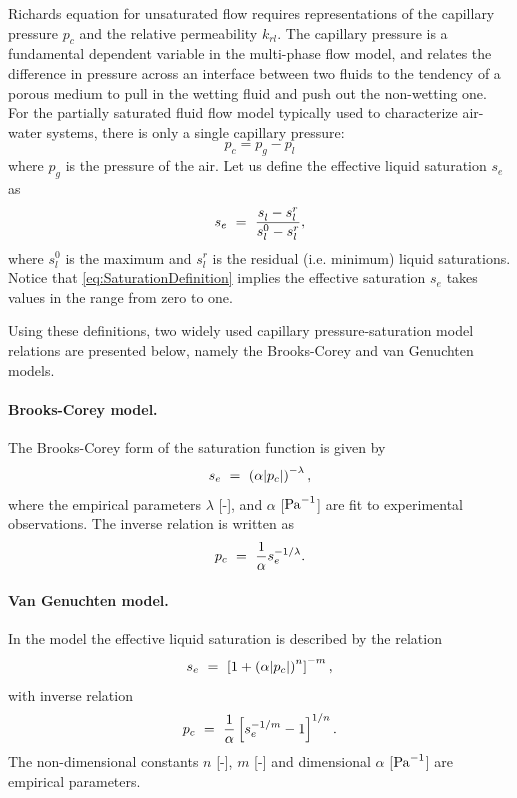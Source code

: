 Richards equation for unsaturated flow
requires representations of the capillary pressure $p_c$ and the relative permeability $k_{rl}$.  
The capillary pressure is a fundamental dependent variable in the multi-phase flow model, and
relates the difference in pressure across an interface between two
fluids to the tendency of a porous medium to pull in the wetting fluid
and push out the non-wetting one.
For the partially saturated fluid flow model typically used to
characterize air-water systems, 
there is only a single capillary pressure:
\begin{equation} \label{eq:GasLiquidCapillaryPressure}
  p_c = p_g - p_l
\end{equation}
where $p_g$ is the pressure of the air. 
Let us define the effective liquid saturation $s_e$ as
\begin{equation}
\label{eq:SaturationDefinition}
s_e \ =\  \frac{s_l^{} - s_l^r}{s_l^0 - s_l^r}, 
\end{equation}
where $s_l^0$ is the maximum and
$s_l^r$ is the residual (i.e. minimum) liquid saturations. 
Notice that \eqref{eq:SaturationDefinition} implies the effective saturation $s_e$
takes values in the range from zero to one.

Using these definitions, 
two widely used capillary pressure-saturation model relations are presented below, 
namely the Brooks-Corey \citep{brooks1964hydraulic} and van Genuchten \citep{van1980closed} 
models.


\paragraph{Brooks-Corey model.}
The Brooks-Corey form of the saturation function \citep{brooks1964hydraulic} is given by
\begin{equation}
  \label{eq:BC_s_pc_relation}
  s_e \ =\  \left( \alpha |p_c| \right)^{-\lambda}, 
\end{equation}
where the empirical parameters $\lambda$ [-], and $\alpha$ [${\rm Pa}^{-1}$] 
are fit to experimental observations.
The inverse relation is written as
\begin{equation}
  \label{eq:BC_pc_s_relation}
  p_c \ =\  \frac{1}{\alpha} s_e^{-1/\lambda}.
\end{equation}

\paragraph{Van Genuchten model.}
In the \citet{van1980closed} model the effective liquid saturation is
described by the relation
%
\begin{equation}  
  \label{eq:vG_s_pc_relation}
  s_e \ =\  \left[1+\left( \alpha |p_c| \right)^n \right]^{-m}, 
\end{equation}
%
with inverse relation
\begin{equation}
  \label{eq:vG_pc_s_relation}
  p_c \ =\  \frac{1}{\alpha} \left[ s_e^{-1/m} -1 \right]^{1/n}.
\end{equation}
%
The non-dimensional constants $n$ [-], $m$ [-] and dimensional $\alpha$ [${\rm Pa}^{-1}$] are
empirical parameters.


